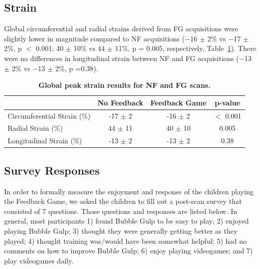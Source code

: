 \subsection{Strain}
	Global circumferential and radial strains derived from FG acquisitions were slightly lower in magnitude compared to NF acquisitions (−16 $\pm$ 2\% vs −17 $\pm$ 2\%, p $<$ 0.001; 40 $\pm$ 10\% vs 44 $\pm$ 11\%, p = 0.005, respectively, Table~\ref{table:FG_strains}). There were no differences in longitudinal strain between NF and FG acquisitions (−13 $\pm$ 2\% vs −13 $\pm$ 2\%, p =0.38).
	
	\begin{table}
		\centering
		\caption[Global peak strain results for NF and FG scans]{\textbf{Global peak strain results for NF and FG scans.}}
		\label{table:FG_strains}
		\begin{tabular}{cccc}
			\toprule
			\multicolumn{1}{l}{}                            & \multicolumn{1}{c}{No Feedback} & \multicolumn{1}{c}{Feedback Game} & \multicolumn{1}{c}{p-value} \\ \midrule
			\multicolumn{1}{l}{Circumferential Strain (\%)} & \multicolumn{1}{c}{-17 $\pm$ 2} & \multicolumn{1}{c}{-16 $\pm$ 2} & \multicolumn{1}{c}{$<$ 0.001} \\ 
			\multicolumn{1}{l}{Radial Strain (\%)}          & \multicolumn{1}{c}{44 $\pm$ 11} & \multicolumn{1}{c}{40 $\pm$ 10} & \multicolumn{1}{c}{0.005} \\
			\multicolumn{1}{l}{Longitudinal Strain (\%)}    & \multicolumn{1}{c}{-13 $\pm$ 2} & \multicolumn{1}{c}{-13 $\pm$ 2} & \multicolumn{1}{c}{0.38} \\
			\bottomrule                                                 
		\end{tabular}
	\end{table}

\subsection{Survey Responses}
	In order to formally measure the enjoyment and response of the children playing the Feedback Game, we asked the children to fill out a post-scan survey that consisted of 7 questions. Those questions and responses are listed below. In general, most participants 1) found Bubble Gulp to be easy to play; 2) enjoyed playing Bubble Gulp; 3) thought they were generally getting better as they played; 4) thought training was/would have been somewhat helpful; 5) had no comments on how to improve Bubble Gulp; 6) enjoy playing videogames; and 7) play videogames daily. 


